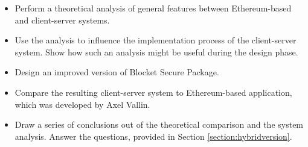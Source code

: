 \begin{itemize}
\item Perform a theoretical analysis of general features between Ethereum-based and client-server systems.
\item Use the analysis to influence the implementation process of the client-server system. Show how such an analysis might be useful during the design phase.
\item Design an improved version of Blocket Secure Package.
\item Compare the resulting client-server system to Ethereum-based application, which was developed by Axel Vallin.
\item Draw a series of conclusions out of the theoretical comparison and the system analysis. Answer the questions, provided in Section \ref{section:hybridversion}.
\end{itemize}

